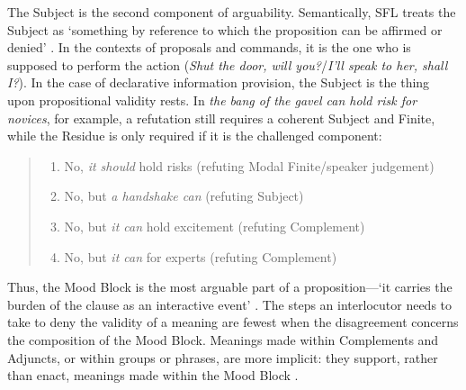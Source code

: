 		The Subject is the second component of arguability. Semantically, SFL treats the Subject as `something by reference to which the proposition can be affirmed or denied' \cite[p.~117]{halliday_introduction_2004}. In the contexts of proposals and commands, it is the one who is supposed to perform the action (\emph{Shut the door, will you?}/\emph{I'll speak to her, shall I?}). In the case of declarative information provision, the Subject is the thing upon propositional validity rests. In \emph{the bang of the gavel can hold risk for novices}, for example, a refutation still requires a coherent Subject and Finite, while the Residue is only required if it is the challenged component:

        \begin{quote}
        \small
        \begin{enumerate}	\setlength\itemsep{-0.5em}
		\item No, \emph{it should} hold risks (refuting Modal Finite/speaker judgement)
		\item No, but \emph{a handshake can} (refuting Subject)
		\item No, but \emph{it can} hold excitement (refuting Complement)
		\item No, but \emph{it can} for experts (refuting Complement)
        \end{enumerate}
        \end{quote}
		Thus, the Mood Block is the most arguable part of a proposition---`it carries the burden of the clause as an interactive event' \cite[p.~118]{halliday_introduction_2004}. The steps an interlocutor needs to take to deny the validity of a meaning are fewest when the disagreement concerns the composition of the Mood Block. Meanings made within Complements and Adjuncts, or within groups or phrases, are more implicit: they support, rather than enact, meanings made within the Mood Block \cite{matthiessen_combining_2002}.





